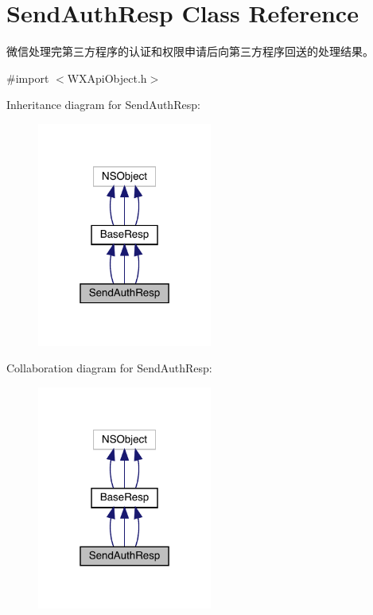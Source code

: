 \hypertarget{interface_send_auth_resp}{}\section{Send\+Auth\+Resp Class Reference}
\label{interface_send_auth_resp}


微信处理完第三方程序的认证和权限申请后向第三方程序回送的处理结果。  




{\ttfamily \#import $<$W\+X\+Api\+Object.\+h$>$}



Inheritance diagram for Send\+Auth\+Resp\+:\nopagebreak
\begin{figure}[H]
\begin{center}
\leavevmode
\includegraphics[width=163pt]{interface_send_auth_resp__inherit__graph}
\end{center}
\end{figure}


Collaboration diagram for Send\+Auth\+Resp\+:\nopagebreak
\begin{figure}[H]
\begin{center}
\leavevmode
\includegraphics[width=163pt]{interface_send_auth_resp__coll__graph}
\end{center}
\end{figure}
